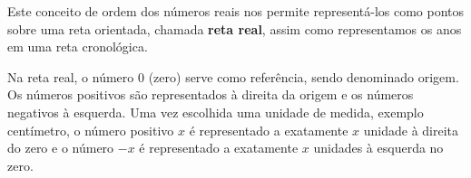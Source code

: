 

Este conceito de ordem dos números reais nos permite representá-los como pontos sobre uma reta orientada, chamada \textbf{reta real}, assim como representamos os anos em uma reta cronológica.


 Na reta real, o número $0$ (zero) serve como referência, sendo denominado origem. Os números positivos são representados à direita da origem e os números negativos à esquerda. Uma vez escolhida uma unidade de medida, exemplo centímetro, o número positivo $x$ é representado a exatamente $x$ unidade à direita do zero e o número $-x$ é representado a exatamente $x$ unidades à esquerda no zero.

